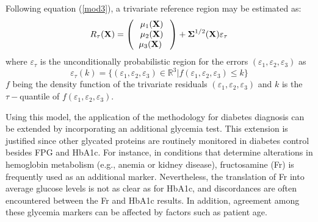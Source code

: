 Following equation (\ref{mod3}), a trivariate reference region may be estimated as:
\begin{equation}
	R_{\tau}(\textbf{X})
	=
	\left( {
		\begin{tabular} {c}
			$\mu_1(\textbf{X})$ \\
			$\mu_2(\textbf{X})$ \\
			$\mu_3(\textbf{X})$ 
			\
		\end{tabular}
	}\right)
	+ 
	\boldsymbol{\Sigma}^{1/2} (\textbf{X}) \varepsilon_{\tau}
\end{equation} 
\noindent where $\varepsilon_{\tau}$ is the unconditionally probabilistic region for the errors $(\varepsilon_1,\varepsilon_2,\varepsilon_{3})$ as 
\begin{equation}
	\varepsilon_{\tau} (k) = \{(\varepsilon_1,\varepsilon_2,\varepsilon_{3}) \in{\mathbb{R}}^3 | f(\varepsilon_1,\varepsilon_2,\varepsilon_{3}) \leq k\}
	\label{rexion_3}
\end{equation}
\noindent
$f$ being the density function of the trivariate residuals  $(\varepsilon_1,\varepsilon_2,\varepsilon_3)$ and  $k$ is the $\tau-$quantile of $f(\varepsilon_1,\varepsilon_2,\varepsilon_3)$. 

Using this model, the application of the methodology for diabetes diagnosis can be extended by incorporating an additional glycemia test. This extension is justified since other glycated proteins are routinely monitored in diabetes control besides FPG and HbA1c. For instance, in conditions that determine alterations in hemoglobin metabolism (e.g., anemia or kidney disease), fructosamine (Fr) is frequently used as an additional marker. Nevertheless, the translation of Fr into average glucose levels is not as clear as for HbA1c, and discordances are often encountered between the Fr and HbA1c results. In addition, agreement among these glycemia markers can be affected by factors such as patient age.

